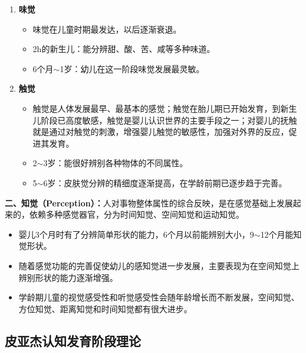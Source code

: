 \begin{keybox}
\begin{enumerate}[leftmargin=*]
    \item \textbf{味觉}
    \begin{itemize}[leftmargin=*]
        \item 味觉在儿童时期最发达，以后逐渐衰退。
        \item 2h的新生儿：能分辨甜、酸、苦、咸等多种味道。
        \item 6个月$\sim$1岁：幼儿在这一阶段味觉发展最灵敏。
    \end{itemize}

    \item \textbf{触觉}
    \begin{itemize}[leftmargin=*]
        \item 触觉是人体发展最早、最基本的感觉；触觉在胎儿期已开始发育，到新生儿阶段已高度敏感，触觉是婴儿认识世界的主要手段之一；对婴儿的抚触就是通过对触觉的刺激，增强婴儿触觉的敏感性，加强对外界的反应，促进其发育。
        \item 2$\sim$3岁：能很好辨别各种物体的不同属性。
        \item 5$\sim$6岁：皮肤觉分辨的精细度逐渐提高，在学龄前期已逐步趋于完善。
    \end{itemize}
\end{enumerate}

\textbf{二、知觉（Perception）：}人对事物整体属性的综合反映，是在感觉基础上发展起来的，依赖多种感觉器官，分为时间知觉、空间知觉和运动知觉。

\begin{itemize}[leftmargin=*]
    \item 婴儿3个月时有了分辨简单形状的能力，6个月以前能辨别大小，9$\sim$12个月能知觉形状。
    \item 随着感觉功能的完善促使幼儿的感知觉进一步发展，主要表现为在空间知觉上辨别形状的能力逐渐增强。
    \item 学龄期儿童的视觉感受性和听觉感受性会随年龄增长而不断发展，空间知觉、方位知觉、距离知觉和时间知觉都有很大进步。
\end{itemize}
\end{keybox}

\subsection{皮亚杰认知发育阶段理论}

